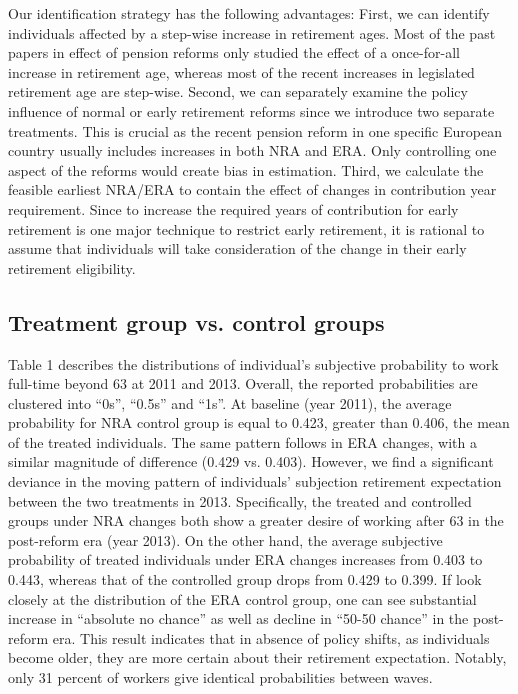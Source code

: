 \documentclass[a4paper]{article}
\begin{document}
Our identification strategy has the following advantages: First, we can identify individuals affected by a step-wise increase in retirement ages. Most of the past papers in effect of pension reforms only studied the effect of a once-for-all increase in retirement age, whereas most of the recent increases in legislated retirement age are step-wise. Second, we can separately examine the policy influence of normal or early retirement reforms since we introduce two separate treatments. This is crucial as the recent pension reform in one specific European country usually includes increases in both NRA and ERA. Only controlling one aspect of the reforms would create bias in estimation. Third, we calculate the feasible earliest NRA/ERA to contain the effect of changes in contribution year requirement. Since to increase the required years of contribution for early retirement is one major technique to restrict early retirement, it is rational to assume that individuals will take consideration of the change in their early retirement eligibility. 

\subsection{Treatment group vs. control groups}

Table 1 describes the distributions of individual’s subjective probability to work full-time beyond 63 at 2011 and 2013. Overall, the reported probabilities are clustered into “0s”, “0.5s” and “1s”. At baseline (year 2011), the average probability for NRA control group is equal to 0.423, greater than 0.406, the mean of the treated individuals. The same pattern follows in ERA changes, with a similar magnitude of difference (0.429 vs. 0.403). However, we find a significant deviance in the moving pattern of individuals’ subjection retirement expectation between the two treatments in 2013. Specifically, the treated and controlled groups under NRA changes both show a greater desire of working after 63 in the post-reform era (year 2013). On the other hand, the average subjective probability of treated individuals under ERA changes increases from 0.403 to 0.443, whereas that of the controlled group drops from 0.429 to 0.399. If look closely at the distribution of the ERA control group, one can see substantial increase in “absolute no chance” as well as decline in “50-50 chance” in the post-reform era. This result indicates that in absence of policy shifts, as individuals become older, they are more certain about their retirement expectation. Notably, only 31 percent of workers give identical probabilities between waves.
\end{document}
